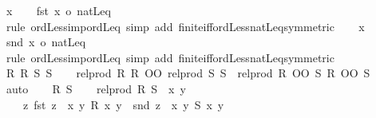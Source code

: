 \begin{isabellebody}
\ x\isanewline
\ \ \isamarkupfalse%
\ {\isachardoublequoteopen}{\isacharbar}{\kern0pt}{\isacharbraceleft}{\kern0pt}fst\ x{\isacharbraceright}{\kern0pt}{\isacharbar}{\kern0pt}\ {\isasymle}o\ natLeq{\isachardoublequoteclose}\isanewline
\ \ \ \ \isamarkupfalse%
\ {\isacharparenleft}{\kern0pt}rule\ ordLess{\isacharunderscore}{\kern0pt}imp{\isacharunderscore}{\kern0pt}ordLeq{\isacharparenright}{\kern0pt}\ {\isacharparenleft}{\kern0pt}simp\ add{\isacharcolon}{\kern0pt}\ finite{\isacharunderscore}{\kern0pt}iff{\isacharunderscore}{\kern0pt}ordLess{\isacharunderscore}{\kern0pt}natLeq{\isacharbrackleft}{\kern0pt}symmetric{\isacharbrackright}{\kern0pt}{\isacharparenright}{\kern0pt}\isanewline
{}\isamarkupfalse%
\isanewline
\ \ \isamarkupfalse%
\ x\isanewline
\ \ \isamarkupfalse%
\ {\isachardoublequoteopen}{\isacharbar}{\kern0pt}{\isacharbraceleft}{\kern0pt}snd\ x{\isacharbraceright}{\kern0pt}{\isacharbar}{\kern0pt}\ {\isasymle}o\ natLeq{\isachardoublequoteclose}\isanewline
\ \ \ \ \isamarkupfalse%
\ {\isacharparenleft}{\kern0pt}rule\ ordLess{\isacharunderscore}{\kern0pt}imp{\isacharunderscore}{\kern0pt}ordLeq{\isacharparenright}{\kern0pt}\ {\isacharparenleft}{\kern0pt}simp\ add{\isacharcolon}{\kern0pt}\ finite{\isacharunderscore}{\kern0pt}iff{\isacharunderscore}{\kern0pt}ordLess{\isacharunderscore}{\kern0pt}natLeq{\isacharbrackleft}{\kern0pt}symmetric{\isacharbrackright}{\kern0pt}{\isacharparenright}{\kern0pt}\isanewline
{}\isamarkupfalse%
\isanewline
\ \ \isamarkupfalse%
\ R{}\ R{}\ S{}\ S{}\isanewline
\ \ \isamarkupfalse%
\ {\isachardoublequoteopen}rel{\isacharunderscore}{\kern0pt}prod\ R{}\ R{}\ OO\ rel{\isacharunderscore}{\kern0pt}prod\ S{}\ S{}\ {\isasymle}\ rel{\isacharunderscore}{\kern0pt}prod\ {\isacharparenleft}{\kern0pt}R{}\ OO\ S{}{\isacharparenright}{\kern0pt}\ {\isacharparenleft}{\kern0pt}R{}\ OO\ S{}{\isacharparenright}{\kern0pt}{\isachardoublequoteclose}\ \isamarkupfalse%
\ auto\isanewline
{}\isamarkupfalse%
\isanewline
\ \ \isamarkupfalse%
\ R\ S\isanewline
\ \ \isamarkupfalse%
\ {\isachardoublequoteopen}rel{\isacharunderscore}{\kern0pt}prod\ R\ S\ {\isacharequal}{\kern0pt}\ {\isacharparenleft}{\kern0pt}{\isasymlambda}x\ y{\isachardot}{\kern0pt}\isanewline
\ \ \ \ {\isasymexists}z{\isachardot}{\kern0pt}\ {\isacharparenleft}{\kern0pt}{\isacharbraceleft}{\kern0pt}fst\ z{\isacharbraceright}{\kern0pt}\ {\isasymsubseteq}\ {\isacharbraceleft}{\kern0pt}{\isacharparenleft}{\kern0pt}x{\isacharcomma}{\kern0pt}\ y{\isacharparenright}{\kern0pt}{\isachardot}{\kern0pt}\ R\ x\ y{\isacharbraceright}{\kern0pt}\ {\isasymand}\ {\isacharbraceleft}{\kern0pt}snd\ z{\isacharbraceright}{\kern0pt}\ {\isasymsubseteq}\ {\isacharbraceleft}{\kern0pt}{\isacharparenleft}{\kern0pt}x{\isacharcomma}{\kern0pt}\ y{\isacharparenright}{\kern0pt}{\isachardot}{\kern0pt}\ S\ x\ y{\isacharbraceright}{\kern0pt}{\isacharparenright}{\kern0pt}\ {\isasymand}\isanewline

\end{isabellebody}
